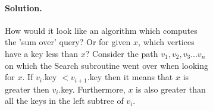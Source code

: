 \begin{figure}[H]
  \begin{subfigure}[b]{0.47\textwidth}
    \paragraph{Solution.} 

How would it look like an algorithm which computes the 'sum over' query? Or for given $x$, which vertices have a key less than $x$? 
Consider the path $v_1,v_2,v_3...v_n$ on which the Search subroutine went over when looking for $x$. If $v_i$.key $ <  v_{i+1}$.key then it means that $x$ is 
greater then $v_{i}$.key. Furthermore, $x$ is also greater than all the keys in the left subtree of $v_{i}$.

\paragraph{}


\end{subfigure}
\end{figure}
